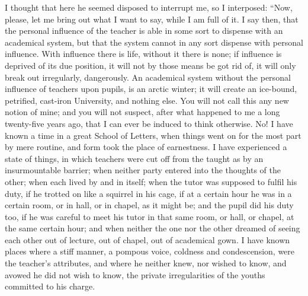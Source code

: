 I thought that here he seemed disposed to interrupt me, so I
interposed: ``Now, please, let me bring out what I want to say,
while I am full of it. I say then, that the personal influence of the
teacher is able in some sort to dispense with an academical system,
but that the system cannot in any sort dispense with personal
influence. With influence there is life, without it there is none; if
influence is deprived of its due position, it will not by those means
be got rid of, it will only break out irregularly, dangerously. An
academical system without the personal influence of teachers upon
pupils, is an arctic winter; it will create an ice-bound, petrified,
cast-iron University, and nothing else. You will not call this any new
notion of mine; and you will not suspect, after what happened to
me a long twenty-five years ago, that I can ever be induced to think
otherwise. No! I have known a time in a great School of Letters, when
things went on for the most part by mere routine, and form took the
place of earnestness. I have experienced a state of things, in which
teachers were cut off from the taught as by an insurmountable barrier;
when neither party entered into the thoughts of the other; when each
lived by and in itself; when the tutor was supposed to fulfil his
duty, if he trotted on like a squirrel in his cage, if at a certain
hour he was in a certain room, or in hall, or in chapel, as it might
be; and the pupil did his duty too, if he was careful to meet his
tutor in that same room, or hall, or chapel, at the same certain hour;
and when neither the one nor the other dreamed of seeing each other
out of lecture, out of chapel, out of academical gown. I have known
places where a stiff manner, a pompous voice, coldness and
condescension, were the teacher's attributes, and where he neither
knew, nor wished to know, and avowed he did not wish to know, the
private irregularities of the youths committed to his charge.

